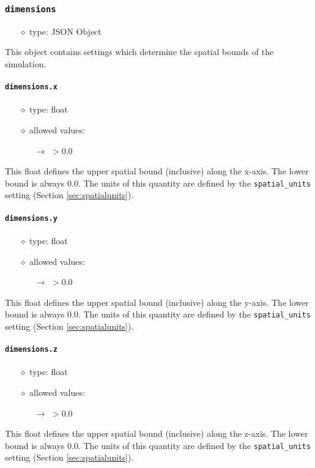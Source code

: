 \documentclass[]{article}
\def\code#1{\texttt{#1}}
\begin{document}
\subsubsection{\code{dimensions}}
\begin{itemize}
    \item[$\diamond$] type: JSON Object 
\end{itemize}
This object contains settings which determine the spatial bounds of the
simulation.

\paragraph{\code{dimensions.x}}\label{sec:dimx}
\begin{itemize}
    \item[$\diamond$] type: float 
    \item[$\diamond$] allowed values:
    \begin{itemize}
        \item[$\rightarrow$] $>0.0$
    \end{itemize}
\end{itemize}
This float defines the upper spatial bound (inclusive) along the x-axis. The
lower bound is always 0.0. The units of this quantity are defined by the
\code{spatial\_units} setting (Section \ref{sec:spatialunits}).

\paragraph{\code{dimensions.y}}\label{sec:dimy}
\begin{itemize}
    \item[$\diamond$] type: float 
    \item[$\diamond$] allowed values:
    \begin{itemize}
        \item[$\rightarrow$] $>0.0$
    \end{itemize}
\end{itemize}
This float defines the upper spatial bound (inclusive) along the y-axis. The
lower bound is always 0.0. The units of this quantity are defined by the
\code{spatial\_units} setting (Section \ref{sec:spatialunits}).

\paragraph{\code{dimensions.z}}\label{sec:dimz}
\begin{itemize}
    \item[$\diamond$] type: float 
    \item[$\diamond$] allowed values:
    \begin{itemize}
        \item[$\rightarrow$] $>0.0$
    \end{itemize}
\end{itemize}
This float defines the upper spatial bound (inclusive) along the z-axis. The
lower bound is always 0.0. The units of this quantity are defined by the
\code{spatial\_units} setting (Section \ref{sec:spatialunits}).
\end{document}
